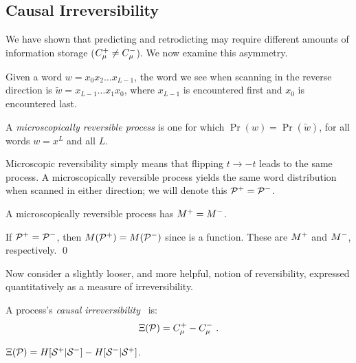 \subsection{Causal Irreversibility}

We have shown that predicting and retrodicting may require different amounts of
information storage (\mbox{$C_\mu^{+} \neq C_\mu^{-}$}). We now examine this asymmetry.

Given a word $w = x_0 x_2 \ldots x_{L-1}$, the word we see when scanning in
the reverse direction is $\widetilde{w} = x_{L-1} \ldots x_1 x_0$, where
$x_{L-1}$ is encountered first and $x_0$ is encountered last.

\begin{Def}
A \emph{microscopically reversible process} is one for which
$\Pr(w) = \Pr(\widetilde{w})$, for all words $w = x^L$ and all $L$.
\end{Def}

Microscopic reversibility simply means that flipping $t \rightarrow -t$ leads
to the same process. A microscopically reversible process yields the same word
distribution when scanned in either direction; we will denote this 
${\mathcal{P}}^{+} = {\mathcal{P}}^{-}$.

\begin{Prop}
A microscopically reversible process has ${M}^{+} = {M}^{-}$.
\label{MR_SameEM}
\end{Prop}

\begin{ProProp}
If ${\mathcal{P}}^{+} = {\mathcal{P}}^{-}$, then $M({\mathcal{P}}^{+}) = 
M({\mathcal{P}}^{-})$ since \eMachine is a function. These
are ${M}^{+}$ and ${M}^{-}$, respectively.
\qed
\end{ProProp}

Now consider a slightly looser, and more helpful, notion of reversibility,
expressed quantitatively as a measure of irreversibility.

\begin{Def}
A process's \emph{causal irreversibility}~\cite{Crut91b} is:
\begin{equation}
\Xi(\mathcal{P}) = C_\mu^{+} - C_\mu^{-} ~.
\end{equation}
\end{Def}

\begin{Cor}
$\Xi(\mathcal{P}) = H[{\mathcal{S}}^{+}|{\mathcal{S}}^{-}] -
H[{\mathcal{S}}^{-}|{\mathcal{S}}^{+}]$.
\end{Cor}

